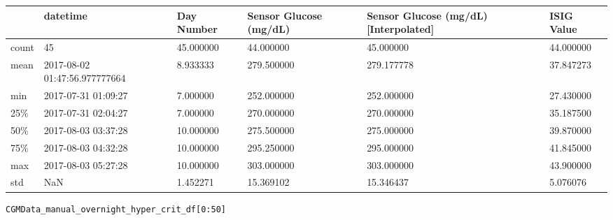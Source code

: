 \bigskip\noindent
\begin{tabular}{p{}p{}p{}p{}p{}p{}}
\toprule
 & datetime & Day Number & Sensor Glucose (mg/dL) & Sensor Glucose (mg/dL) [Interpolated] & ISIG Value \\
\hline
count & 45 & 45.000000 & 44.000000 & 45.000000 & 44.000000 \\
\hline
mean & 2017-08-02 01:47:56.977777664 & 8.933333 & 279.500000 & 279.177778 & 37.847273 \\
\hline
min & 2017-07-31 01:09:27 & 7.000000 & 252.000000 & 252.000000 & 27.430000 \\
\hline
25\% & 2017-07-31 02:04:27 & 7.000000 & 270.000000 & 270.000000 & 35.187500 \\
\hline
50\% & 2017-08-03 03:37:28 & 10.000000 & 275.500000 & 275.000000 & 39.870000 \\
\hline
75\% & 2017-08-03 04:32:28 & 10.000000 & 295.250000 & 295.000000 & 41.845000 \\
\hline
max & 2017-08-03 05:27:28 & 10.000000 & 303.000000 & 303.000000 & 43.900000 \\
\hline
std & NaN & 1.452271 & 15.369102 & 15.346437 & 5.076076 \\
\hline
\bottomrule
\end{tabular}

\bigskip

\begin{verbatim}
CGMData_manual_overnight_hyper_crit_df[0:50]
\end{verbatim}

